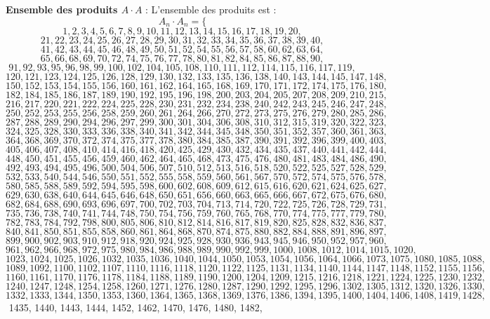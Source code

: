 \documentclass[11pt,a4paper]{article}
\begin{document}
\textbf{Ensemble des produits $A \cdot A$} :
L'ensemble des produits est :
$$ A_{{{n}}} \cdot A_{{{n}}} = \{ $$$$ 1, 2, 3, 4, 5, 6, 7, 8, 9, 10, 11, 12, 13, 14, 15, 16, 17, 18, 19, 20, $$$$ 21, 22, 23, 24, 25, 26, 27, 28, 29, 30, 31, 32, 33, 34, 35, 36, 37, 38, 39, 40, $$$$ 41, 42, 43, 44, 45, 46, 48, 49, 50, 51, 52, 54, 55, 56, 57, 58, 60, 62, 63, 64, $$$$ 65, 66, 68, 69, 70, 72, 74, 75, 76, 77, 78, 80, 81, 82, 84, 85, 86, 87, 88, 90, $$$$ 91, 92, 93, 95, 96, 98, 99, 100, 102, 104, 105, 108, 110, 111, 112, 114, 115, 116, 117, 119, $$$$ 120, 121, 123, 124, 125, 126, 128, 129, 130, 132, 133, 135, 136, 138, 140, 143, 144, 145, 147, 148, $$$$ 150, 152, 153, 154, 155, 156, 160, 161, 162, 164, 165, 168, 169, 170, 171, 172, 174, 175, 176, 180, $$$$ 182, 184, 185, 186, 187, 189, 190, 192, 195, 196, 198, 200, 203, 204, 205, 207, 208, 209, 210, 215, $$$$ 216, 217, 220, 221, 222, 224, 225, 228, 230, 231, 232, 234, 238, 240, 242, 243, 245, 246, 247, 248, $$$$ 250, 252, 253, 255, 256, 258, 259, 260, 261, 264, 266, 270, 272, 273, 275, 276, 279, 280, 285, 286, $$$$ 287, 288, 289, 290, 294, 296, 297, 299, 300, 301, 304, 306, 308, 310, 312, 315, 319, 320, 322, 323, $$$$ 324, 325, 328, 330, 333, 336, 338, 340, 341, 342, 344, 345, 348, 350, 351, 352, 357, 360, 361, 363, $$$$ 364, 368, 369, 370, 372, 374, 375, 377, 378, 380, 384, 385, 387, 390, 391, 392, 396, 399, 400, 403, $$$$ 405, 406, 407, 408, 410, 414, 416, 418, 420, 425, 429, 430, 432, 434, 435, 437, 440, 441, 442, 444, $$$$ 448, 450, 451, 455, 456, 459, 460, 462, 464, 465, 468, 473, 475, 476, 480, 481, 483, 484, 486, 490, $$$$ 492, 493, 494, 495, 496, 500, 504, 506, 507, 510, 512, 513, 516, 518, 520, 522, 525, 527, 528, 529, $$$$ 532, 533, 540, 544, 546, 550, 551, 552, 555, 558, 559, 560, 561, 567, 570, 572, 574, 575, 576, 578, $$$$ 580, 585, 588, 589, 592, 594, 595, 598, 600, 602, 608, 609, 612, 615, 616, 620, 621, 624, 625, 627, $$$$ 629, 630, 638, 640, 644, 645, 646, 648, 650, 651, 656, 660, 663, 665, 666, 667, 672, 675, 676, 680, $$$$ 682, 684, 688, 690, 693, 696, 697, 700, 702, 703, 704, 713, 714, 720, 722, 725, 726, 728, 729, 731, $$$$ 735, 736, 738, 740, 741, 744, 748, 750, 754, 756, 759, 760, 765, 768, 770, 774, 775, 777, 779, 780, $$$$ 782, 783, 784, 792, 798, 800, 805, 806, 810, 812, 814, 816, 817, 819, 820, 825, 828, 832, 836, 837, $$$$ 840, 841, 850, 851, 855, 858, 860, 861, 864, 868, 870, 874, 875, 880, 882, 884, 888, 891, 896, 897, $$$$ 899, 900, 902, 903, 910, 912, 918, 920, 924, 925, 928, 930, 936, 943, 945, 946, 950, 952, 957, 960, $$$$ 961, 962, 966, 968, 972, 975, 980, 984, 986, 988, 989, 990, 992, 999, 1000, 1008, 1012, 1014, 1015, 1020, $$$$ 1023, 1024, 1025, 1026, 1032, 1035, 1036, 1040, 1044, 1050, 1053, 1054, 1056, 1064, 1066, 1073, 1075, 1080, 1085, 1088, $$$$ 1089, 1092, 1100, 1102, 1107, 1110, 1116, 1118, 1120, 1122, 1125, 1131, 1134, 1140, 1144, 1147, 1148, 1152, 1155, 1156, $$$$ 1160, 1161, 1170, 1176, 1178, 1184, 1188, 1189, 1190, 1200, 1204, 1209, 1215, 1216, 1218, 1221, 1224, 1225, 1230, 1232, $$$$ 1240, 1247, 1248, 1254, 1258, 1260, 1271, 1276, 1280, 1287, 1290, 1292, 1295, 1296, 1302, 1305, 1312, 1320, 1326, 1330, $$$$ 1332, 1333, 1344, 1350, 1353, 1360, 1364, 1365, 1368, 1369, 1376, 1386, 1394, 1395, 1400, 1404, 1406, 1408, 1419, 1428, $$$$ 1435, 1440, 1443, 1444, 1452, 1462, 1470, 1476, 1480, 1482, 
\end{document}
